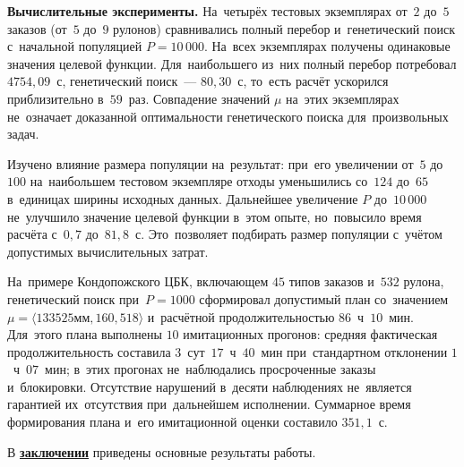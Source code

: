 \textbf{Вычислительные эксперименты.} На~четырёх тестовых экземплярах от~$2$ до~$5$ заказов (от~$5$ до~$9$ рулонов) сравнивались полный перебор и~генетический поиск с~начальной популяцией $P=10\,000$. На~всех экземплярах получены одинаковые значения целевой функции. Для~наибольшего из~них полный перебор потребовал $4754{,}09$~с, генетический поиск~--- $80{,}30$~с, то~есть расчёт ускорился приблизительно в~$59$~раз. Совпадение значений $\mu$ на~этих экземплярах не~означает доказанной оптимальности генетического поиска для~произвольных задач.

Изучено влияние размера популяции на~результат: при~его увеличении от~$5$ до~$100$ на~наибольшем тестовом экземпляре отходы уменьшились со~$124$ до~$65$ в~единицах ширины исходных данных. Дальнейшее увеличение $P$ до~$10\,000$ не~улучшило значение целевой функции в~этом опыте, но~повысило время расчёта с~$0{,}7$ до~$81{,}8$~с. Это~позволяет подбирать размер популяции с~учётом допустимых вычислительных затрат.

На~примере Кондопожского ЦБК, включающем $45$ типов заказов и~$532$ рулона, генетический поиск при~$P=1000$ сформировал допустимый план со~значением $\mu=\langle133525$мм$,160,518\rangle$ и~расчётной продолжительностью $86$~ч~$10$~мин. Для~этого плана выполнены $10$ имитационных прогонов: средняя фактическая продолжительность составила $3$~сут~$17$~ч~$40$~мин при~стандартном отклонении $1$~ч~$07$~мин; в~этих прогонах не~наблюдались просроченные заказы и~блокировки. Отсутствие нарушений в~десяти наблюдениях не~является гарантией их~отсутствия при~дальнейшем исполнении. Суммарное время формирования плана и~его имитационной оценки составило $351{,}1$~с.

\FloatBarrier
{}                                  %
В \underline{\textbf{заключении}} приведены основные результаты работы.


